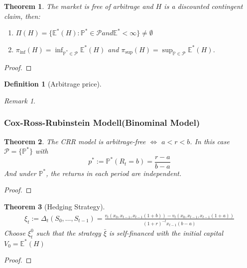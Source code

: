 \documentclass[a4paper,11pt]{book}
\newtheorem{theorem}{Theorem}[section]
\theoremstyle{definition}
\newtheorem{definition}{Definition}[section]
\theoremstyle{remark}
\newtheorem*{remark}{Remark}
\begin{document}
\begin{theorem}
The market is free of arbitrage and $H$ is a discounted contingent claim, then:
\begin{enumerate}
	\item $\Pi(H) = \{ \mathbb{E}^*(H): \mathbb{P}^* \in \mathcal{P} and \mathbb{E}^* < \infty \} \neq \emptyset$
	\item $\pi_{\inf}(H) = \inf_{\mathbb{P}^* \in \mathcal{P}} \mathbb{E}^*(H)$ and $\pi_{\sup}(H) = \sup_{\mathbb{P} \in \mathcal{P}} \mathbb{E}^*(H)$.
\end{enumerate}
\end{theorem}
\begin{proof}
\end{proof}

\begin{definition}[Arbitrage price]
\end{definition}
\begin{remark}
\end{remark}


\subsubsection{Cox-Ross-Rubinstein Modell(Binominal Model)}
\begin{theorem}
	\quad \newline
	The CRR model is arbitrage-free $\Leftrightarrow$ $a < r < b$.
	In this case $\mathcal{P} = \{ \mathbb{P}^*\}$ with
	\begin{equation*}
		p^* := \mathbb{P}^*(R_t = b) = \frac{r - a}{b - a}
	\end{equation*} 
	And under $\mathbb{P}^*$, the returns in each period are independent.
\end{theorem}
\begin{proof}
\end{proof}

\begin{theorem}[Hedging Strategy]
	\begin{align*}
		\xi_t := \Delta_t(S_0, \dots, S_{t - 1}) = \frac{v_t(x_0, x_{t - 1}, x_{t-1}(1 + b)) - v_t(x_0, x_{t - 1}, x_{t-1}(1 + a))}{(1 + r)^{-t} x_{t - 1}(b -a)}
	\end{align*}
	Choose $\xi^0_t$ such that the strategy $\bar{\xi}$ is self-financed with the initial capital $V_0 = \mathbb{E}^*(H)$
\end{theorem}
\begin{proof}
\end{proof}
\end{document}
